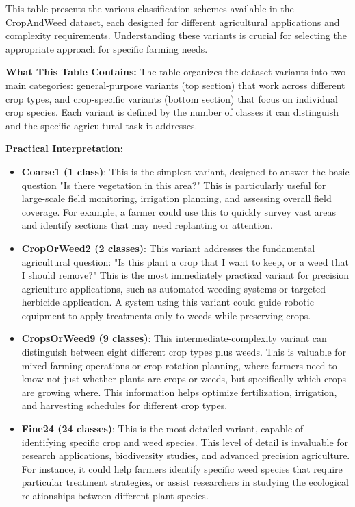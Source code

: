 This table presents the various classification schemes available in the CropAndWeed dataset, each designed for different agricultural applications and complexity requirements. Understanding these variants is crucial for selecting the appropriate approach for specific farming needs.

\textbf{What This Table Contains:} The table organizes the dataset variants into two main categories: general-purpose variants (top section) that work across different crop types, and crop-specific variants (bottom section) that focus on individual crop species. Each variant is defined by the number of classes it can distinguish and the specific agricultural task it addresses.

\textbf{Practical Interpretation:}

\begin{itemize}
    \item \textbf{Coarse1 (1 class)}: This is the simplest variant, designed to answer the basic question "Is there vegetation in this area?" This is particularly useful for large-scale field monitoring, irrigation planning, and assessing overall field coverage. For example, a farmer could use this to quickly survey vast areas and identify sections that may need replanting or attention.
    
    \item \textbf{CropOrWeed2 (2 classes)}: This variant addresses the fundamental agricultural question: "Is this plant a crop that I want to keep, or a weed that I should remove?" This is the most immediately practical variant for precision agriculture applications, such as automated weeding systems or targeted herbicide application. A system using this variant could guide robotic equipment to apply treatments only to weeds while preserving crops.
    
    \item \textbf{CropsOrWeed9 (9 classes)}: This intermediate-complexity variant can distinguish between eight different crop types plus weeds. This is valuable for mixed farming operations or crop rotation planning, where farmers need to know not just whether plants are crops or weeds, but specifically which crops are growing where. This information helps optimize fertilization, irrigation, and harvesting schedules for different crop types.
    
    \item \textbf{Fine24 (24 classes)}: This is the most detailed variant, capable of identifying specific crop and weed species. This level of detail is invaluable for research applications, biodiversity studies, and advanced precision agriculture. For instance, it could help farmers identify specific weed species that require particular treatment strategies, or assist researchers in studying the ecological relationships between different plant species.
    

\end{itemize}
